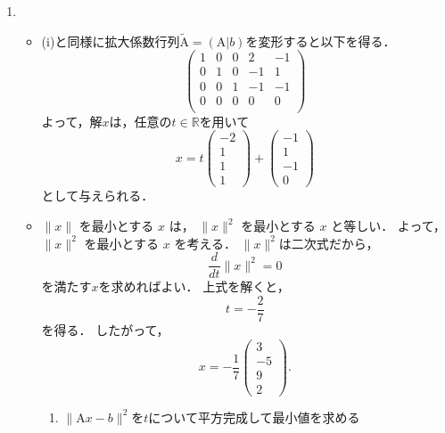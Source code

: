 \begin{enumerate}[label=(\roman*)]
    \item
    \begin{itemize}
      \item (i)と同様に拡大係数行列$\tilde{\mathrm{A}} = (\mathrm{A}|b)$を変形すると以下を得る．
        \begin{equation}
          \left(
            \begin{array}{rrrr|r}
              1 & 0 & 0 &  2 & -1 \\
              0 & 1 & 0 & -1 &  1 \\
              0 & 0 & 1 & -1 & -1 \\
              0 & 0 & 0 &  0 &  0 \\
            \end{array}
          \right)
        \end{equation}
        よって，解$x$は，任意の$t \in \mathbb{R}$を用いて
        \begin{equation}
          x = t
            \left(
            \begin{array}{r}
              -2 \\ 1 \\ 1 \\ 1
            \end{array}
            \right)
            +
            \left(
            \begin{array}{r}
              -1 \\ 1 \\ -1 \\ 0
            \end{array}
            \right)
        \end{equation}
        として与えられる．
      \item $\|x\|$ を最小とする $x$ は，
      $\|x\|^2$ を最小とする $x$ と等しい．
      よって，$\|x\|^2$ を最小とする $x$ を考える．
      $\|x\|^2$は二次式だから，
      \begin{equation}
        \frac{d}{dt} \| x \|^2 = 0
      \end{equation}
      を満たす$x$を求めればよい．
      上式を解くと，
      \begin{equation}
        t = -\frac{2}{7}
      \end{equation}
      を得る．
      したがって，
      \begin{equation}
        x = -\frac{1}{7}
          \left(
          \begin{array}{r}
              3 \\
             -5 \\
              9 \\
              2
          \end{array}
          \right).
      \end{equation}
      \begin{enumerate}[label=別解\arabic*]
        \item $\|\mathrm{A}x-b\|^2$を$t$について平方完成して最小値を求める
      \end{enumerate}
    \end{itemize}
  \end{enumerate}

